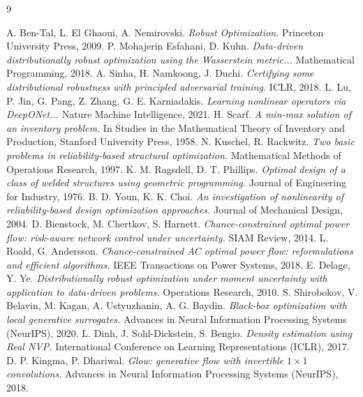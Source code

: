 \documentclass[11pt]{article}
\begin{document}
\begin{thebibliography}{9}

 A. Ben-Tal, L. El Ghaoui, A. Nemirovski. \emph{Robust Optimization.} Princeton University Press, 2009.
 P. Mohajerin Esfahani, D. Kuhn. \emph{Data-driven distributionally robust optimization using the Wasserstein metric...} Mathematical Programming, 2018.
 A. Sinha, H. Namkoong, J. Duchi. \emph{Certifying some distributional robustness with principled adversarial training.} ICLR, 2018.
 L. Lu, P. Jin, G. Pang, Z. Zhang, G. E. Karniadakis. \emph{Learning nonlinear operators via DeepONet...} Nature Machine Intelligence, 2021.
 H. Scarf. \emph{A min-max solution of an inventory problem.} In Studies in the Mathematical Theory of Inventory and Production, Stanford University Press, 1958.
 N. Kuschel, R. Rackwitz. \emph{Two basic problems in reliability-based structural optimization.} Mathematical Methods of Operations Research, 1997.
 K. M. Ragsdell, D. T. Phillips. \emph{Optimal design of a class of welded structures using geometric programming.} Journal of Engineering for Industry, 1976.
 B. D. Youn, K. K. Choi. \emph{An investigation of nonlinearity of reliability-based design optimization approaches.} Journal of Mechanical Design, 2004.
 D. Bienstock, M. Chertkov, S. Harnett. \emph{Chance-constrained optimal power flow: risk-aware network control under uncertainty.} SIAM Review, 2014.
 L. Roald, G. Andersson. \emph{Chance-constrained AC optimal power flow: reformulations and efficient algorithms.} IEEE Transactions on Power Systems, 2018.
 E. Delage, Y. Ye. \emph{Distributionally robust optimization under moment uncertainty with application to data-driven problems.} Operations Research, 2010.
 S. Shirobokov, V. Belavin, M. Kagan, A. Ustyuzhanin, A. G. Baydin. \emph{Black-box optimization with local generative surrogates.} Advances in Neural Information Processing Systems (NeurIPS), 2020.
 L. Dinh, J. Sohl-Dickstein, S. Bengio. \emph{Density estimation using Real NVP.} International Conference on Learning Representations (ICLR), 2017.
 D. P. Kingma, P. Dhariwal. \emph{Glow: generative flow with invertible $1\times1$ convolutions.} Advances in Neural Information Processing Systems (NeurIPS), 2018.

\end{thebibliography}
\end{document}
